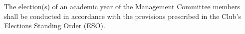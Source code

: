 
\section{}
The election(s) of an academic year of the Management Committee members shall be conducted in accordance with the provisions prescribed in the Club’s Elections Standing Order (ESO).